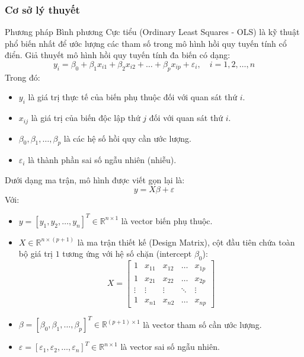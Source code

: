 \subsubsection{Cơ sở lý thuyết}
Phương pháp Bình phương Cực tiểu (Ordinary Least Squares - OLS) là kỹ thuật phổ biến nhất để ước lượng các tham số trong mô hình hồi quy tuyến tính cổ điển. Giả thuyết mô hình hồi quy tuyến tính đa biến có dạng:
\begin{equation}
    y_i = \beta_0 + \beta_1 x_{i1} + \beta_2 x_{i2} + \dots + \beta_p x_{ip} + \varepsilon_i, \quad i = 1, 2, \dots, n
\end{equation}
Trong đó:
\begin{itemize}
    \item $y_i$ là giá trị thực tế của biến phụ thuộc đối với quan sát thứ $i$.
    \item $x_{ij}$ là giá trị của biến độc lập thứ $j$ đối với quan sát thứ $i$.
    \item $\beta_0, \beta_1, \dots, \beta_p$ là các hệ số hồi quy cần ước lượng.
    \item $\varepsilon_i$ là thành phần sai số ngẫu nhiên (nhiễu).
\end{itemize}

Dưới dạng ma trận, mô hình được viết gọn lại là:
\begin{equation}
    y = X\beta + \varepsilon
\end{equation}
Với:
\begin{itemize}
    \item $y = [y_1, y_2, \dots, y_n]^T \in \mathbb{R}^{n \times 1}$ là vector biến phụ thuộc.
    \item $X \in \mathbb{R}^{n \times (p+1)}$ là ma trận thiết kế (Design Matrix), cột đầu tiên chứa toàn bộ giá trị $1$ tương ứng với hệ số chặn (intercept $\beta_0$):
    \begin{equation}
        X = \begin{bmatrix}
            1 & x_{11} & x_{12} & \dots & x_{1p} \\
            1 & x_{21} & x_{22} & \dots & x_{2p} \\
            \vdots & \vdots & \vdots & \ddots & \vdots \\
            1 & x_{n1} & x_{n2} & \dots & x_{np}
        \end{bmatrix}
    \end{equation}
    \item $\beta = [\beta_0, \beta_1, \dots, \beta_p]^T \in \mathbb{R}^{(p+1) \times 1}$ là vector tham số cần ước lượng.
    \item $\varepsilon = [\varepsilon_1, \varepsilon_2, \dots, \varepsilon_n]^T \in \mathbb{R}^{n \times 1}$ là vector sai số ngẫu nhiên.
\end{itemize}


